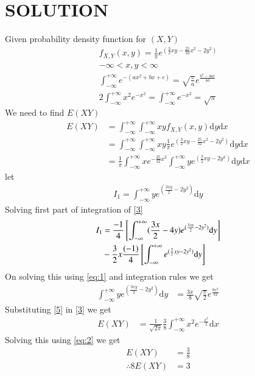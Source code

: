 \documentclass[journal,12pt,twocolumn]{IEEEtran}
\begin{document}
\section*{SOLUTION}
Given probability density function for $(X,Y)$
\begin{align}
f_{X,Y}(x,y)=\frac{1}{\pi}e^{(\frac{3}{2}xy-\frac{25}{32}x^2-2y^2)}\\ \label{1}
-\infty < x,y < \infty
\end{align}
\begin{align}
\int_{-\infty}^{+\infty} e^{-(ax^2+bx+c)} = \sqrt{\frac{\pi}{a}}e^{\frac{b^2-4ac}{4a}} \label{eq:1} \\
2\int_{-\infty}^{+\infty}x^2 e^{-x^2} = \int_{-\infty}^{+\infty} e^{-x^2}=\sqrt{\pi} \label{eq:2} 
\end{align}
We need to find $E(XY)$
\begin{align}
E(XY)&= \int_{-\infty}^{+\infty}\int_{-\infty}^{+\infty} xyf_{X,Y}(x,y)\mathrm{d}y \mathrm{d}x \label{2}\\
&=\int_{-\infty}^{+\infty}\int_{-\infty}^{+\infty} xy \frac{1}{\pi}e^{(\frac{3}{2}xy-\frac{25}{32}x^2-2y^2)} \mathrm{d}y \mathrm{d}x \\
&=\frac{1}{\pi}\int_{-\infty}^{+\infty} xe^{-\frac{25}{32}x^2 } \int_{-\infty}^{+\infty} y e^{(\frac{3}{2}xy-2y^2)} \mathrm{d}y \mathrm{d}x \label{3}
\end{align}
let 
\begin{align}
I_1=\int_{-\infty}^{+\infty} y e^{(\frac{3xy}{2}-2y^2)} \mathrm{d}y \label{eq:3}
\end{align}
Solving first part of integration of \eqref{3}
\begin{align}
I_1 &= \frac{-1}{4} {}\left[\int_{-\infty}^{+\infty}(\frac{3x}{2}-4y)e^{(\frac{3xy}{2}-2y^2)} \mathrm{d}y\right] \notag \\
& -\frac{3}{2}x\frac{(-1)}{4} {}\left[\int_{-\infty}^{+\infty}e^{(\frac{3}{2}xy-2y^2)} \mathrm{d}y \right] \label{4}
\end{align}
On solving this using \eqref{eq:1} and integration rules we get
\begin{align}
\int_{-\infty}^{+\infty} y e^{(\frac{3xy}{2}-2y^2)} \mathrm{d}y &= \frac{3x}{8} \sqrt{\frac{\pi}{2}}e^{\frac{9x^2}{32}} \label{5}
\end{align}
Substituting \eqref{5} in \eqref{3} we get
\begin{align}
E(XY)&=\frac{1}{\sqrt{2\pi}}\frac{3}{8}\int_{-\infty}^{+\infty} x^2e^{-\frac{x^2}{2} } \mathrm{d}x
\end{align}
Solving this using \eqref{eq:2} we get
\begin{align}
E(XY)&=\frac{3}{8} \label{6}\\
\therefore 8E(XY)&=3
\end{align}
\end{document}
